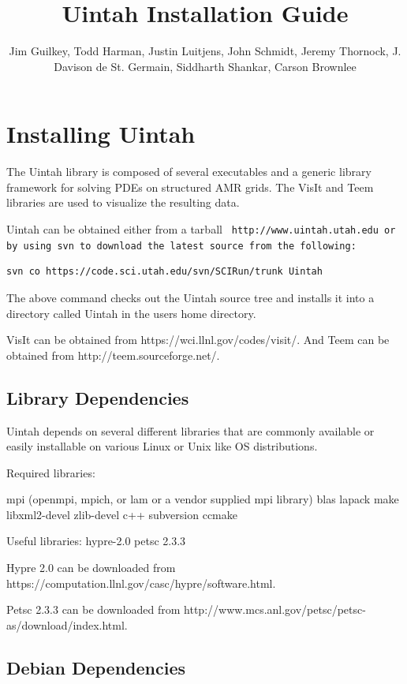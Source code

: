 \documentclass[12pt]{article}
\begin{document}
\title{Uintah Installation Guide}

\author{Jim Guilkey, Todd Harman, Justin Luitjens, John Schmidt,
  Jeremy Thornock, J. Davison de St. Germain, Siddharth Shankar,
  Carson Brownlee}

\chapter{Installing Uintah} \label{Sec:installation}

The Uintah library is composed of several executables and a generic
library framework for solving PDEs on structured AMR grids.  The VisIt
and Teem libraries are used to visualize the resulting data.

Uintah can be obtained either from a tarball \tt
http://www.uintah.utah.edu \normalfont or by using svn to download the
latest source from the following:

\begin{Verbatim}[fontsize=\footnotesize]
  svn co https://code.sci.utah.edu/svn/SCIRun/trunk Uintah
\end{Verbatim}

The above command checks out the Uintah source tree and installs it
into a directory called Uintah in the users home directory.

VisIt can be obtained from https://wci.llnl.gov/codes/visit/. And Teem
can be obtained from http://teem.sourceforge.net/.

\section{Library Dependencies}

Uintah depends on several different libraries that are commonly
available or easily installable on various Linux or Unix like OS
distributions.  

Required libraries:

mpi (openmpi, mpich, or lam or a vendor supplied mpi library)
blas
lapack
make
libxml2-devel
zlib-devel
c++
subversion
ccmake

Useful libraries:
hypre-2.0
petsc 2.3.3

Hypre 2.0 can be downloaded from
https://computation.llnl.gov/casc/hypre/software.html.

Petsc 2.3.3 can be downloaded from
http://www.mcs.anl.gov/petsc/petsc-as/download/index.html.

\section{Debian Dependencies}
\end{document}
